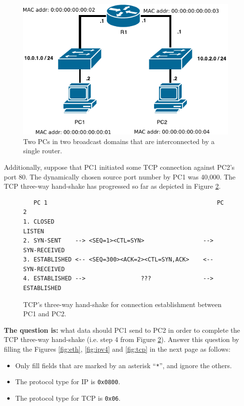 \documentclass[pdftex,12pt,a4paper]{article}
\begin{document}
        \begin{figure}[tbh]
            \centering
            \includegraphics[width=.85\textwidth]{figures/diag1}
            \caption{Two PCs in two broadcast domains that are interconnected
            by a single router.}
            \label{fig1}
        \end{figure}

        Additionally, suppose that PC1 initiated some TCP connection against
        PC2's port 80. The dynamically chosen source port number by PC1 was
        40,000. The TCP three-way hand-shake has progressed so far as depicted
        in Figure \ref{fig:tcpsyn}.

        \begin{figure}[tbh]
        \centering
        \small\begin{verbatim}   PC 1                                                 PC 2 
1. CLOSED                                               LISTEN
2. SYN-SENT    --> <SEQ=1><CTL=SYN>                 --> SYN-RECEIVED
3. ESTABLISHED <-- <SEQ=300><ACK=2><CTL=SYN,ACK>    <-- SYN-RECEIVED
4. ESTABLISHED -->                ???               --> ESTABLISHED\end{verbatim}\normalsize
       \vspace{-15pt}
       \caption{TCP's three-way hand-shake for connection establishment between
       PC1 and PC2.}
       \label{fig:tcpsyn}
       \end{figure}

       \textbf{The question is:} what data should PC1 send to PC2 in order to complete
       the TCP three-way hand-shake (i.e. step 4 from Figure \ref{fig:tcpsyn}). Answer this question by filling the
       Figures \ref{fig:eth}, \ref{fig:ipv4} and \ref{fig:tcp} in the next page as follows:
       \begin{itemize}
           \item Only fill fields that are marked by an
               asterisk ``\texttt{*}'', and ignore the others.
           \item The protocol type for IP is \texttt{0x0800}.
           \item The protocol type for TCP is \texttt{0x06}.
       \end{itemize}
\end{document}
